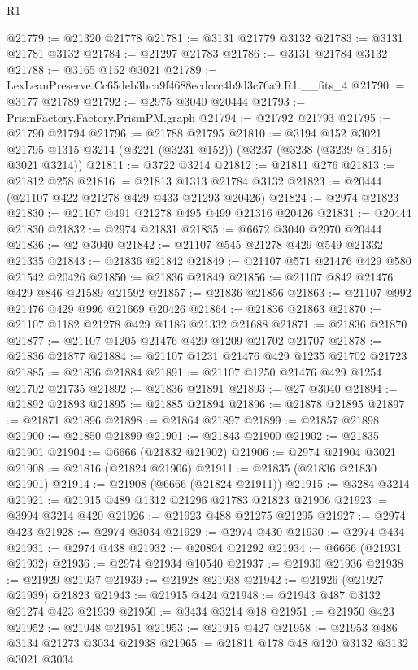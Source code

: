 \begin{lexlean}{R1}
\begin{coremodule}
@21779 := @21320 @21778
@21781 := @3131 @21779 @3132
@21783 := @3131 @21781 @3132
@21784 := @21297 @21783
@21786 := @3131 @21784 @3132
@21788 := @3165 @152 @3021
@21789 := LexLeanPreserve.Cc65deb3bca9f4688ecdccc4b9d3c76a9.R1.__fits_4
@21790 := @3177 @21789
@21792 := @2975 @3040 @20444
@21793 := PrismFactory.Factory.PrismPM.graph
@21794 := @21792 @21793
@21795 := @21790 @21794
@21796 := @21788 @21795
@21810 := @3194
    @152
    @3021
    @21795
    @1315
    @3214
    (@3221 (@3231 @152))
    (@3237 (@3238 (@3239 @1315) @3021 @3214))
@21811 := @3722 @3214
@21812 := @21811 @276
@21813 := @21812 @258
@21816 := @21813 @1313 @21784 @3132
@21823 := @20444 (@21107 @422 @21278 @429 @433 @21293 @20426)
@21824 := @2974 @21823
@21830 := @21107 @491 @21278 @495 @499 @21316 @20426
@21831 := @20444 @21830
@21832 := @2974 @21831
@21835 := @6672 @3040 @2970 @20444
@21836 := @2 @3040
@21842 := @21107 @545 @21278 @429 @549 @21332 @21335
@21843 := @21836 @21842
@21849 := @21107 @571 @21476 @429 @580 @21542 @20426
@21850 := @21836 @21849
@21856 := @21107 @842 @21476 @429 @846 @21589 @21592
@21857 := @21836 @21856
@21863 := @21107 @992 @21476 @429 @996 @21669 @20426
@21864 := @21836 @21863
@21870 := @21107 @1182 @21278 @429 @1186 @21332 @21688
@21871 := @21836 @21870
@21877 := @21107 @1205 @21476 @429 @1209 @21702 @21707
@21878 := @21836 @21877
@21884 := @21107 @1231 @21476 @429 @1235 @21702 @21723
@21885 := @21836 @21884
@21891 := @21107 @1250 @21476 @429 @1254 @21702 @21735
@21892 := @21836 @21891
@21893 := @27 @3040
@21894 := @21892 @21893
@21895 := @21885 @21894
@21896 := @21878 @21895
@21897 := @21871 @21896
@21898 := @21864 @21897
@21899 := @21857 @21898
@21900 := @21850 @21899
@21901 := @21843 @21900
@21902 := @21835 @21901
@21904 := @6666 (@21832 @21902)
@21906 := @2974 @21904 @3021
@21908 := @21816 (@21824 @21906)
@21911 := @21835 (@21836 @21830 @21901)
@21914 := @21908 (@6666 (@21824 @21911))
@21915 := @3284 @3214
@21921 := @21915 @489 @1312 @21296 @21783 @21823 @21906
@21923 := @3994 @3214 @420
@21926 := @21923 @488 @21275 @21295
@21927 := @2974 @423
@21928 := @2974 @3034
@21929 := @2974 @430
@21930 := @2974 @434
@21931 := @2974 @438
@21932 := @20894 @21292
@21934 := @6666 (@21931 @21932)
@21936 := @2974 @21934 @10540
@21937 := @21930 @21936
@21938 := @21929 @21937
@21939 := @21928 @21938
@21942 := @21926 (@21927 @21939) @21823
@21943 := @21915 @424
@21948 := @21943 @487 @3132 @21274 @423 @21939
@21950 := @3434 @3214 @18
@21951 := @21950 @423
@21952 := @21948 @21951
@21953 := @21915 @427
@21958 := @21953 @486 @3134 @21273 @3034 @21938
@21965 := @21811 @178 @48 @120 @3132 @3132 @3021 @3034

\end{coremodule}
\end{lexlean}
